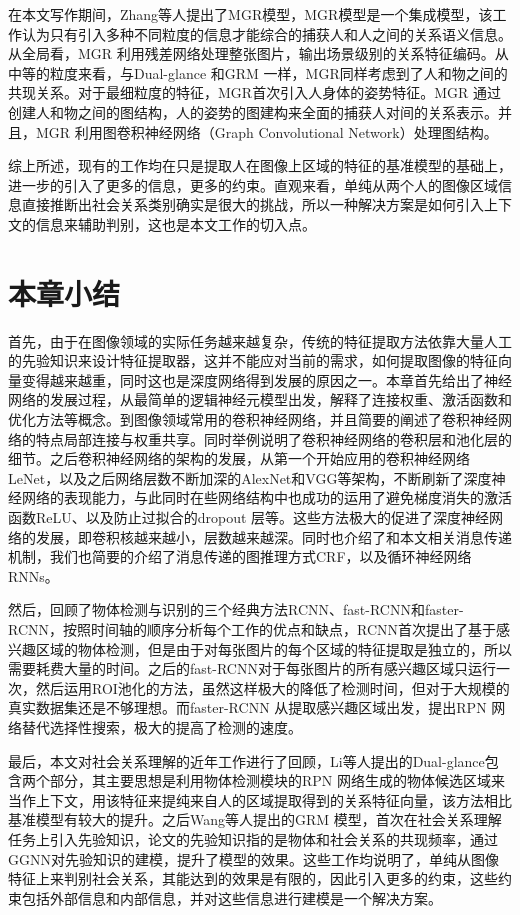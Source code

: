 在本文写作期间，Zhang等人\cite{zhang2019multi}提出了MGR模型，MGR模型是一个集成模型，该工作认为只有引入多种不同粒度的信息才能综合的捕获人和人之间的关系语义信息。从全局看，MGR 利用残差网络处理整张图片，输出场景级别的关系特征编码。从中等的粒度来看，与Dual-glance 和GRM 一样，MGR同样考虑到了人和物之间的共现关系。对于最细粒度的特征，MGR首次引入人身体的姿势特征。MGR 通过创建人和物之间的图结构，人的姿势的图建构来全面的捕获人对间的关系表示。并且，MGR 利用图卷积神经网络（Graph Convolutional Network）\cite{kipf2016semi}处理图结构。


综上所述，现有的工作均在只是提取人在图像上区域的特征的基准模型的基础上，进一步的引入了更多的信息，更多的约束。直观来看，单纯从两个人的图像区域信息直接推断出社会关系类别确实是很大的挑战，所以一种解决方案是如何引入上下文的信息来辅助判别，这也是本文工作的切入点。

\section{本章小结}

首先，由于在图像领域的实际任务越来越复杂，传统的特征提取方法依靠大量人工的先验知识来设计特征提取器，这并不能应对当前的需求，如何提取图像的特征向量变得越来越重，同时这也是深度网络得到发展的原因之一。本章首先给出了神经网络的发展过程，从最简单的逻辑神经元模型出发，解释了连接权重、激活函数和优化方法等概念。到图像领域常用的卷积神经网络，并且简要的阐述了卷积神经网络的特点局部连接与权重共享。同时举例说明了卷积神经网络的卷积层和池化层的细节。之后卷积神经网络的架构的发展，从第一个开始应用的卷积神经网络LeNet，以及之后网络层数不断加深的AlexNet和VGG等架构，不断刷新了深度神经网络的表现能力，与此同时在些网络结构中也成功的运用了避免梯度消失的激活函数ReLU、以及防止过拟合的dropout 层等。这些方法极大的促进了深度神经网络的发展，即卷积核越来越小，层数越来越深。同时也介绍了和本文相关消息传递机制，我们也简要的介绍了消息传递的图推理方式CRF，以及循环神经网络RNNs。

然后，回顾了物体检测与识别的三个经典方法RCNN、fast-RCNN和faster-RCNN，按照时间轴的顺序分析每个工作的优点和缺点，RCNN首次提出了基于感兴趣区域的物体检测，但是由于对每张图片的每个区域的特征提取是独立的，所以需要耗费大量的时间。之后的fast-RCNN对于每张图片的所有感兴趣区域只运行一次，然后运用ROI池化的方法，虽然这样极大的降低了检测时间，但对于大规模的真实数据集还是不够理想。而faster-RCNN 从提取感兴趣区域出发，提出RPN 网络替代选择性搜索，极大的提高了检测的速度。

最后，本文对社会关系理解的近年工作进行了回顾，Li等人提出的Dual-glance包含两个部分，其主要思想是利用物体检测模块的RPN 网络生成的物体候选区域来当作上下文，用该特征来提纯来自人的区域提取得到的关系特征向量，该方法相比基准模型有较大的提升。之后Wang等人提出的GRM 模型，首次在社会关系理解任务上引入先验知识，论文的先验知识指的是物体和社会关系的共现频率，通过GGNN对先验知识的建模，提升了模型的效果。这些工作均说明了，单纯从图像特征上来判别社会关系，其能达到的效果是有限的，因此引入更多的约束，这些约束包括外部信息和内部信息，并对这些信息进行建模是一个解决方案。







